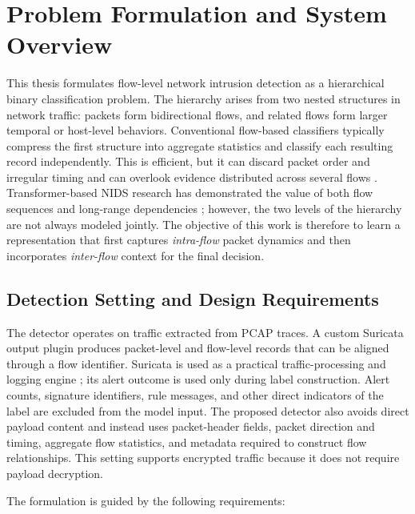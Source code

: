 \documentclass[11pt,fleqn]{report}
\begin{document}
\chapter{Problem Formulation and System Overview}
\label{sec:problem_formulation}

This thesis formulates flow-level network intrusion detection as a hierarchical binary classification problem. The hierarchy arises from two nested structures in network traffic: packets form bidirectional flows, and related flows form larger temporal or host-level behaviors. Conventional flow-based classifiers typically compress the first structure into aggregate statistics and classify each resulting record independently. This is efficient, but it can discard
packet order and irregular timing and can overlook evidence distributed across several flows \cite{SommerPaxson2010,Han2023GTID,LiuPatras2022NetSentry}. Transformer-based NIDS research has demonstrated the value of both flow sequences and long-range dependencies \cite{Manocchio2024FlowTransformer,MartinReizabal2026FlowWindow}; however, the two levels of the hierarchy are not always modeled jointly. The objective of this work is therefore to learn a representation that first captures \emph{intra-flow} packet dynamics and then incorporates \emph{inter-flow} context for the final decision.

\section{Detection Setting and Design Requirements}
\label{subsec:detection_setting}

The detector operates on traffic extracted from PCAP traces. A custom Suricata
output plugin produces packet-level and flow-level records that can be aligned
through a flow identifier. Suricata is used as a practical traffic-processing
and logging engine \cite{Roesch1999,SuricataGuide2026}; its alert outcome is
used only during label construction. Alert counts, signature identifiers, rule
messages, and other direct indicators of the label are excluded from the model
input. The proposed detector also avoids direct payload content and instead
uses packet-header fields, packet direction and timing, aggregate flow
statistics, and metadata required to construct flow relationships. This setting
supports encrypted traffic because it does not require payload decryption.

The formulation is guided by the following requirements:
\end{document}
